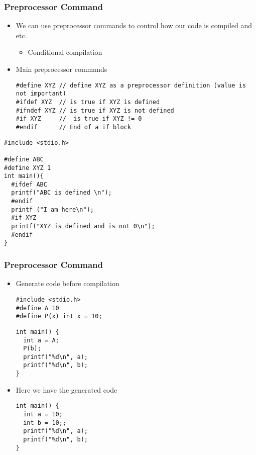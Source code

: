 \documentclass{../c-lecture}
\begin{document}
\begin{frame}[fragile]
  \frametitle{Preprocessor Command}
  \begin{itemize}
    \item
      We can use preprocessor commands to control how our code is compiled and
      etc.
    \begin{itemize}
      \item Conditional compilation
    \end{itemize}
    \item Main preprocessor commands
    \begin{verbatim}
#define XYZ // define XYZ as a preprocessor definition (value is not important)
#ifdef XYZ  // is true if XYZ is defined
#ifndef XYZ // is true if XYZ is not defined
#if XYZ     //  is true if XYZ != 0
#endif      // End of a if block
    \end{verbatim}
  \end{itemize}
\end{frame}

\begin{frame}[fragile]
  \begin{verbatim}
#include <stdio.h>

#define ABC
#define XYZ 1
int main(){
  #ifdef ABC
  printf("ABC is defined \n");
  #endif
  printf ("I am here\n");
  #if XYZ
  printf("XYZ is defined and is not 0\n");
  #endif
}
  \end{verbatim}
\end{frame}

\begin{frame}[fragile]
  \frametitle{Preprocessor Command}
  \begin{itemize}
    \item Generate code before compilation
    \begin{verbatim}
#include <stdio.h>
#define A 10
#define P(x) int x = 10;
    \end{verbatim}
    \begin{verbatim}
int main() {
  int a = A;
  P(b);
  printf("%d\n", a);
  printf("%d\n", b);
}
    \end{verbatim}
  \end{itemize}
\end{frame}

\begin{frame}[fragile]
  \begin{itemize}
    \item Here we have the generated code
    \begin{verbatim}
int main() {
  int a = 10;
  int b = 10;;
  printf("%d\n", a);
  printf("%d\n", b);
}
    \end{verbatim}
  \end{itemize}
\end{frame}
\end{document}
